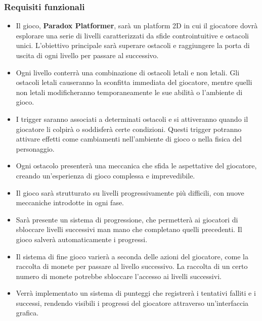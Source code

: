\documentclass[a4paper,12pt]{report}
\begin{document}
\subsubsection{Requisiti funzionali}
\begin{itemize}
\item Il gioco, \textbf{Paradox Platformer}, sarà un platform 2D in cui il giocatore dovrà esplorare una serie di livelli caratterizzati da sfide controintuitive e ostacoli unici. L’obiettivo principale sarà superare ostacoli e raggiungere la porta di uscita di ogni livello per passare al successivo.
\item Ogni livello conterrà una combinazione di ostacoli letali e non letali. Gli ostacoli letali causeranno la sconfitta immediata del giocatore, mentre quelli non letali modificheranno temporaneamente le sue abilità o l’ambiente di gioco.
\item I trigger saranno associati a determinati ostacoli e si attiveranno quando il giocatore li colpirà o soddisferà certe condizioni. Questi trigger potranno attivare effetti come cambiamenti nell’ambiente di gioco o nella fisica del personaggio.
\item Ogni ostacolo presenterà una meccanica che sfida le aspettative del giocatore, creando un’esperienza di gioco complessa e imprevedibile.
\item Il gioco sarà strutturato su livelli progressivamente più difficili, con nuove meccaniche introdotte in ogni fase.
\item Sarà presente un sistema di progressione, che permetterà ai giocatori di sbloccare livelli successivi man mano che completano quelli precedenti. Il gioco salverà automaticamente i progressi.
\item Il sistema di fine gioco varierà a seconda delle azioni del giocatore, come la raccolta di monete per passare al livello successivo. La raccolta di un certo numero di monete potrebbe sbloccare l'accesso ai livelli successivi.
\item Verrà implementato un sistema di punteggi che registrerà i tentativi falliti e i successi, rendendo visibili i progressi del giocatore attraverso un’interfaccia grafica.
\end{itemize}
\end{document}
